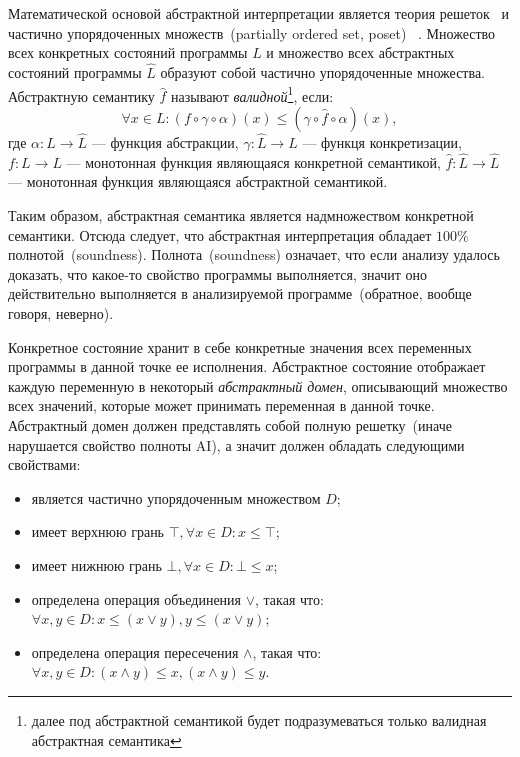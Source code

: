 Математической основой абстрактной интерпретации является теория решеток~\cite{
lattice} и частично упорядоченных множеств~(partially ordered set, poset)
~\cite{poset}. Множество всех конкретных состояний программы $L$ и множество
всех абстрактных состояний программы $\hat{L}$ образуют собой частично 
упорядоченные множества. Абстрактную семантику $\hat{f}$ называют \emph{валидной}\footnote{далее
под абстрактной семантикой будет подразумеваться только валидная абстрактная
семантика}, если:
\begin{equation*}
\forall x \in L: (f \circ \gamma \circ \alpha)(x) \le (\gamma \circ \hat{f} 
\circ \alpha)(x),
\end{equation*}
где $\alpha: L \rightarrow \hat{L}$ --- функция абстракции, $\gamma: 
\hat{L} \rightarrow L$ --- функця конкретизации, $f: L \rightarrow L$ --- 
монотонная функция являющаяся конкретной семантикой, $\hat{f}: \hat{L}
\rightarrow \hat {L}$ --- монотонная функция являющаяся абстрактной 
семантикой.

Таким образом, абстрактная семантика является надмножеством конкретной 
семантики. Отсюда следует, что абстрактная интерпретация обладает $100\%$ 
полнотой~(soundness). Полнота~(soundness) означает, что если анализу удалось 
доказать, что какое-то свойство программы выполняется, значит
оно действительно выполняется в анализируемой программе~(обратное, вообще
говоря, неверно).

Конкретное состояние хранит в себе конкретные значения всех переменных 
программы в данной точке ее исполнения. Абстрактное состояние отображает каждую
переменную в некоторый \emph{абстрактный домен}, описывающий множество всех
значений, которые может принимать переменная в данной точке. Абстрактный домен
должен представлять собой полную решетку~(иначе нарушается свойство полноты 
AI), а значит должен обладать следующими свойствами:
\begin{itemize}
\item является частично упорядоченным множеством $D$;
\item имеет верхнюю грань $\top, \forall x \in D: x \le \top$;
\item имеет нижнюю грань $\bot, \forall x \in D: \bot \le x$;
\item определена операция объединения $\vee$, такая что:\\ $\forall x, y \in D: x \le (x \vee y), y \le (x \vee y)$;

\item определена операция пересечения $\wedge$, такая что:\\
$\forall x, y \in D: (x \wedge y) \le x, (x \wedge y) \le y$.
\end{itemize}

